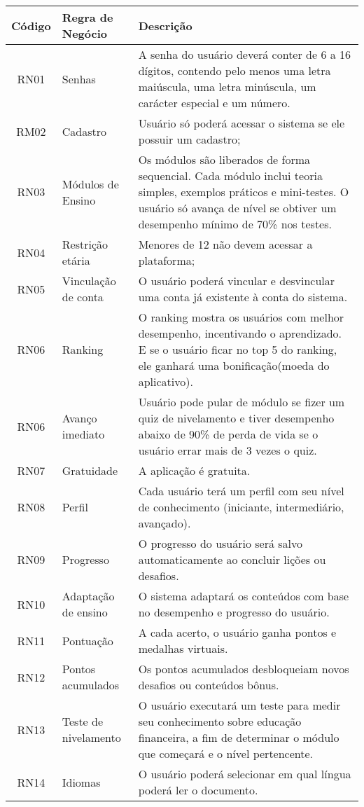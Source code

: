 \documentclass[
	article,			%
	12pt,				%
	oneside,			%
	a4paper,			%
	english,			%
	brazil,				%
	sumario=tradicional
	]{abntex2}
\begin{document}
\begin{center}
\vspace{-0.0cm}

\begin{tabular}{|c|l|p{8cm}|}
\hline
\textbf{Código} & \textbf{Regra de Negócio} & \textbf{Descrição} \\
\hline
RN01 & Senhas & A senha do usuário deverá conter de 6 a 16 dígitos, contendo pelo menos uma letra maiúscula, uma letra minúscula, um carácter especial e um número. \\
\hline
RM02 & Cadastro & Usuário só poderá acessar o sistema se ele possuir um cadastro; \\
\hline
RN03 & Módulos de Ensino & Os módulos são liberados de forma sequencial. Cada módulo inclui teoria simples, exemplos práticos e mini-testes. O usuário só avança de nível se obtiver um desempenho mínimo de 70\% nos testes. \\
\hline
RN04 & Restrição etária & Menores de 12 não devem acessar a plataforma; \\
\hline
RN05 & Vinculação de conta & O usuário poderá vincular e desvincular uma conta já existente à conta do sistema. \\
\hline
RN06 & Ranking &  O ranking mostra os usuários com melhor desempenho, incentivando o aprendizado. E se o usuário ficar no top 5 do ranking, ele ganhará uma bonificação(moeda do aplicativo). \\
\hline
RN06 & Avanço imediato & Usuário pode pular de módulo se fizer um quiz de nivelamento e tiver desempenho abaixo de 90\% de perda de vida se o usuário errar mais de 3 vezes o quiz.\\
\hline
RN07 & Gratuidade & A aplicação é gratuita.\\
\hline
RN08 & Perfil & Cada usuário terá um perfil com seu nível de conhecimento (iniciante, intermediário, avançado).\\
\hline
RN09 & Progresso & O progresso do usuário será salvo automaticamente ao concluir lições ou desafios. \\
\hline
RN10 & Adaptação de ensino & O sistema adaptará os conteúdos com base no desempenho e progresso do usuário.\\
\hline
RN11 & Pontuação & A cada acerto, o usuário ganha pontos e medalhas virtuais. \\
\hline
RN12 & Pontos acumulados & Os pontos acumulados desbloqueiam novos desafios ou conteúdos bônus. \\
\hline
RN13 & Teste de nivelamento & O usuário executará um teste para medir seu conhecimento sobre educação financeira, a fim de determinar o módulo que começará e o nível pertencente. \\
\hline
RN14 & Idiomas & O usuário poderá selecionar em qual língua poderá ler o documento. \\
\hline
\end{tabular}
\end{center}
\end{document}
